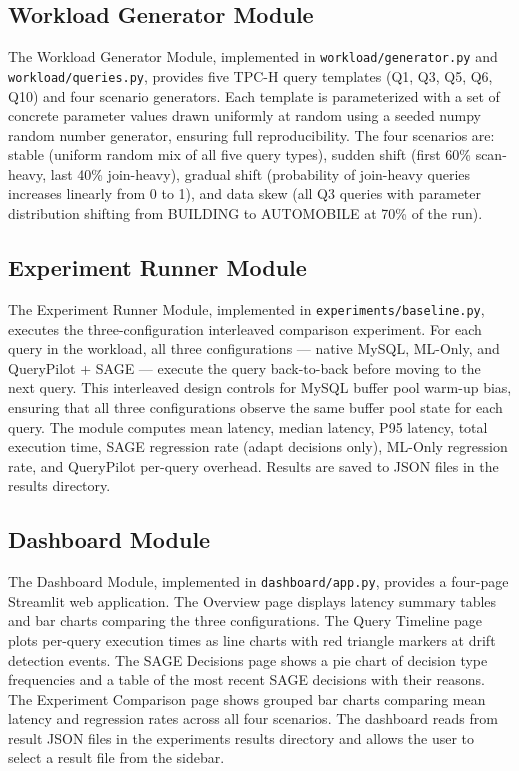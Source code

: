 \subsection{Workload Generator Module}
\label{subsec:workload_generator}

The Workload Generator Module, implemented in \texttt{workload/generator.py}
and \texttt{workload/queries.py}, provides five TPC-H query templates (Q1, Q3,
Q5, Q6, Q10) and four scenario generators. Each template is parameterized with
a set of concrete parameter values drawn uniformly at random using a seeded
numpy random number generator, ensuring full reproducibility. The four
scenarios are: stable (uniform random mix of all five query types), sudden
shift (first 60\% scan-heavy, last 40\% join-heavy), gradual shift (probability
of join-heavy queries increases linearly from 0 to 1), and data skew (all Q3
queries with parameter distribution shifting from BUILDING to AUTOMOBILE at
70\% of the run).

\subsection{Experiment Runner Module}
\label{subsec:experiment_runner}

The Experiment Runner Module, implemented in \texttt{experiments/baseline.py},
executes the three-configuration interleaved comparison experiment. For each
query in the workload, all three configurations --- native MySQL, ML-Only, and
QueryPilot + SAGE --- execute the query back-to-back before moving to the next
query. This interleaved design controls for MySQL buffer pool warm-up bias,
ensuring that all three configurations observe the same buffer pool state for
each query. The module computes mean latency, median latency, P95 latency,
total execution time, SAGE regression rate (adapt decisions only), ML-Only
regression rate, and QueryPilot per-query overhead. Results are saved to JSON
files in the results directory.

\subsection{Dashboard Module}
\label{subsec:dashboard}

The Dashboard Module, implemented in \texttt{dashboard/app.py}, provides a
four-page Streamlit web application. The Overview page displays latency summary
tables and bar charts comparing the three configurations. The Query Timeline
page plots per-query execution times as line charts with red triangle markers
at drift detection events. The SAGE Decisions page shows a pie chart of
decision type frequencies and a table of the most recent SAGE decisions with
their reasons. The Experiment Comparison page shows grouped bar charts
comparing mean latency and regression rates across all four scenarios. The
dashboard reads from result JSON files in the experiments results directory and
allows the user to select a result file from the sidebar.

